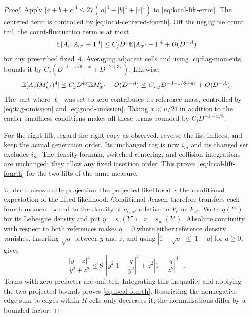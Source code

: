 \begin{proof}
Apply $|a+b+c|^4\le27(|a|^4+|b|^4+|c|^4)$ to
\eqref{eq:local-lift-error}.  The centered term is controlled by
\eqref{eq:local-centered-fourth}.  Off the negligible count tail,
the count-fluctuation term is at most
\[
 \mathbb E[A_v|A_{w'}-1|^4]
     \le C_jD^x\mathbb E|A_{w'}-1|^4+O(D^{-A})
\]
for any prescribed fixed $A$.  Averaging adjacent cells and using
\eqref{eq:flag-moments} bounds it by
$C_j(D^{-1-u/6+x}+D^{-2+3x})$.  Likewise,
\[
 \mathbb E[A_v(M_{w'}')^4]
       \le C_jD^{4x}\mathbb E M_{w'}'+O(D^{-A})
       \le C_{x,j}D^{-1-1/8+4x}+O(D^{-A}).
\]
The part where $\ell_v$ was set to zero contributes its reference
mass, controlled by \eqref{eq:tag-omission} and
\eqref{eq:good-omission}.  Taking $x<u/24$ in addition to the earlier
smallness conditions makes all these terms bounded by
$C_jD^{-1-u/8}$.

For the right lift, regard the right copy as observed, reverse the
list indices, and keep the actual generation order.  Its unchanged
tag is now $i_m$ and its changed set excludes $i_m$.  The density
formula, switched centering, and collision integrations are unchanged:
they allow any fixed insertion order.  This proves
\eqref{eq:local-lift-fourth} for the two lifts of the same measure.

Under a measurable projection, the projected likelihood is the
conditional expectation of the lifted likelihood.  Conditional
Jensen therefore transfers each fourth-moment bound to the density
of $\nu_{v,w'}$ relative to $P_v$ or $P_{w'}$.  Write $q(Y')$ for
its Lebesgue density and put $y=s_v(Y')$, $z=s_{w'}(Y')$.
Absolute continuity with respect to both references makes $q=0$
where either reference density vanishes.  Inserting $\sqrt q$ between
$y$ and $z$, and using $|1-\sqrt a|\le|1-a|$ for $a\ge0$, gives
\[
 \frac{|y-z|^4}{y^2+z^2}
   \le 8\left[y^2\left|1-\frac q{y^2}\right|^4
               +z^2\left|1-\frac q{z^2}\right|^4\right].
\]
Terms with zero prefactor are omitted.  Integrating this inequality
and applying the two projected bounds proves \eqref{eq:local-fourth}.
Restricting the nonnegative edge sum to edges within $R$-cells only
decreases it; the normalizations differ by a bounded factor.
\end{proof}
